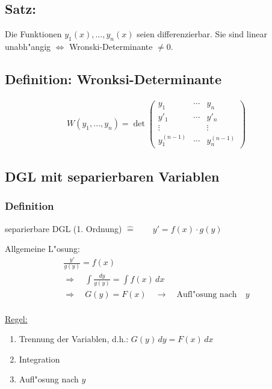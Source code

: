 \subsection{Satz:}
Die Funktionen $y_1(x), \ldots, y_n(x)$ seien differenzierbar. Sie sind linear
unabh"angig $\Longleftrightarrow$ Wronski-Determinante $\neq 0$.

\subsection{Definition: Wronksi-Determinante}
\begin{gather}
	W(y_1, \ldots, y_n) = \det
	\begin{pmatrix}
		y_1 & \cdots & y_n \\
		y'_1 & \cdots & y'_n \\
		\vdots & & \vdots \\
		y^{(n-1)}_1 & \cdots & y^{(n-1)}_n
	\end{pmatrix}
\end{gather}

\subsection{DGL mit separierbaren Variablen}
\subsubsection{Definition}
separierbare DGL (1. Ordnung) $\hat{=}\qquad y' = f(x)\cdot g(y)$

Allgemeine L"osung:
\begin{gather*}
	\frac{y'}{g(y)} = f(x) \\
	\Longrightarrow\quad\int\frac{dy}{g(y)} = \int f(x)\,dx \\
	\Longrightarrow\quad G(y) = F(x) \quad\longrightarrow\quad\text{Aufl"osung nach}\quad y
\end{gather*}
\\
\underline{Regel:}
\begin{enumerate}
\item Trennung der Variablen, d.h.: $G(y)\,dy = F(x)\,dx$
\item Integration
\item Aufl"osung nach $y$
\end{enumerate}

